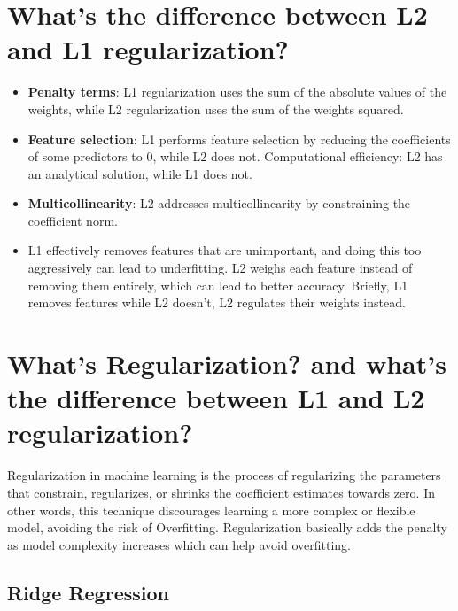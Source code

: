 \documentclass[
]{book}
\begin{document}
\hypertarget{whats-the-difference-between-l2-and-l1-regularization}{%
\section{What's the difference between L2 and L1 regularization?}\label{whats-the-difference-between-l2-and-l1-regularization}}

\begin{itemize}
\item
  \textbf{Penalty terms}: L1 regularization uses the sum of the absolute values of the weights, while L2 regularization uses the sum of the weights squared.
\item
  \textbf{Feature selection}: L1 performs feature selection by reducing the coefficients of some predictors to 0, while L2 does not.
  Computational efficiency: L2 has an analytical solution, while L1 does not.
\item
  \textbf{Multicollinearity}: L2 addresses multicollinearity by constraining the coefficient norm.
\item
  L1 effectively removes features that are unimportant, and doing this too aggressively can lead to underfitting. L2 weighs each feature instead of removing them entirely, which can lead to better accuracy. Briefly, L1 removes features while L2 doesn't, L2 regulates their weights instead.
\end{itemize}

\hypertarget{whats-regularization-and-whats-the-difference-between-l1-and-l2-regularization}{%
\section{What's Regularization? and what's the difference between L1 and L2 regularization?}\label{whats-regularization-and-whats-the-difference-between-l1-and-l2-regularization}}

Regularization in machine learning is the process of regularizing the parameters that constrain, regularizes, or shrinks the coefficient estimates towards zero. In other words, this technique discourages learning a more complex or flexible model, avoiding the risk of Overfitting. Regularization basically adds the penalty as model complexity increases which can help avoid overfitting.

\hypertarget{ridge-regression}{%
\subsection{Ridge Regression}\label{ridge-regression}}
\end{document}
